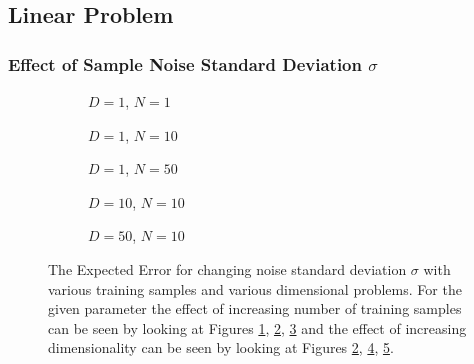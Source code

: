 \subsection{Linear Problem}
\subsubsection{Effect of Sample Noise Standard Deviation $\sigma$}
\begin{figure}[!h]
  \centering
    \begin{subfigure}{0.3\textwidth}
      \centering
      \caption{$D=1$, $N=1$}
      \label{fig:linear-std_y-N-1-D-1}
    \end{subfigure}
    \begin{subfigure}{0.3\textwidth}
      \centering
      \caption{$D=1$, $N=10$}
      \label{fig:linear-std_y-N-10-D-1}
    \end{subfigure}
    \begin{subfigure}{0.3\textwidth}
      \centering
      \caption{$D=1$, $N=50$}
      \label{fig:linear-std_y-N-50-D-1}
    \end{subfigure}

    \begin{subfigure}{0.3\textwidth}
      \centering
      \caption{$D=10$, $N=10$}
      \label{fig:linear-std_y-N-10-D-10}
    \end{subfigure}
    \begin{subfigure}{0.3\textwidth}
      \centering
      \caption{$D=50$, $N=10$}
      \label{fig:linear-std_y-N-10-D-50}
    \end{subfigure}  

  \caption{The Expected Error for changing noise standard deviation $\sigma$ with various training samples and various dimensional problems. For the given parameter the effect of increasing number of training samples can be seen by looking at Figures \ref{fig:linear-std_y-N-1-D-1}, \ref{fig:linear-std_y-N-10-D-1}, \ref{fig:linear-std_y-N-50-D-1} and the effect of increasing dimensionality can be seen by looking at Figures \ref{fig:linear-std_y-N-10-D-1}, \ref{fig:linear-std_y-N-10-D-10}, \ref{fig:linear-std_y-N-10-D-50}.}\label{fig:linear-std_y}
\end{figure}

